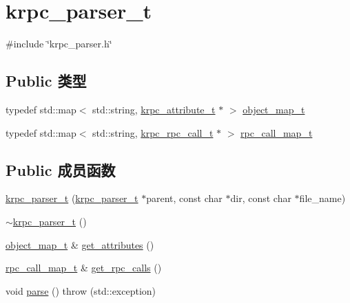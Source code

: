 \hypertarget{classkrpc__parser__t}{}\section{krpc\+\_\+parser\+\_\+t}
\label{classkrpc__parser__t}


{\ttfamily \#include \char`\"{}krpc\+\_\+parser.\+h\char`\"{}}

\subsection*{Public 类型}
\begin{DoxyCompactItemize}
\item 
typedef std\+::map$<$ std\+::string, \hyperlink{classkrpc__attribute__t}{krpc\+\_\+attribute\+\_\+t} $\ast$ $>$ \hyperlink{classkrpc__parser__t_a2e43854d69b1505000c452feb196e4a6}{object\+\_\+map\+\_\+t}
\item 
typedef std\+::map$<$ std\+::string, \hyperlink{classkrpc__rpc__call__t}{krpc\+\_\+rpc\+\_\+call\+\_\+t} $\ast$ $>$ \hyperlink{classkrpc__parser__t_a17e6cf9e3f91f90b0e06055f1d2be839}{rpc\+\_\+call\+\_\+map\+\_\+t}
\end{DoxyCompactItemize}
\subsection*{Public 成员函数}
\begin{DoxyCompactItemize}
\item 
\hyperlink{classkrpc__parser__t_a7428409ffe64512e9cbf8d534eec7ee9}{krpc\+\_\+parser\+\_\+t} (\hyperlink{classkrpc__parser__t}{krpc\+\_\+parser\+\_\+t} $\ast$parent, const char $\ast$dir, const char $\ast$file\+\_\+name)
\item 
\hyperlink{classkrpc__parser__t_a9f7e664698171fb1e71d9768de1bdc34}{$\sim$krpc\+\_\+parser\+\_\+t} ()
\item 
\hyperlink{classkrpc__parser__t_a2e43854d69b1505000c452feb196e4a6}{object\+\_\+map\+\_\+t} \& \hyperlink{classkrpc__parser__t_acd79a609b32dee7d524a4a3287291a27}{get\+\_\+attributes} ()
\item 
\hyperlink{classkrpc__parser__t_a17e6cf9e3f91f90b0e06055f1d2be839}{rpc\+\_\+call\+\_\+map\+\_\+t} \& \hyperlink{classkrpc__parser__t_afad76c489daebed275cfbadc39da897d}{get\+\_\+rpc\+\_\+calls} ()
\item 
void \hyperlink{classkrpc__parser__t_ad7c704b34912678d95c13243cacf9d7f}{parse} ()  throw (std\+::exception)
\end{DoxyCompactItemize}
